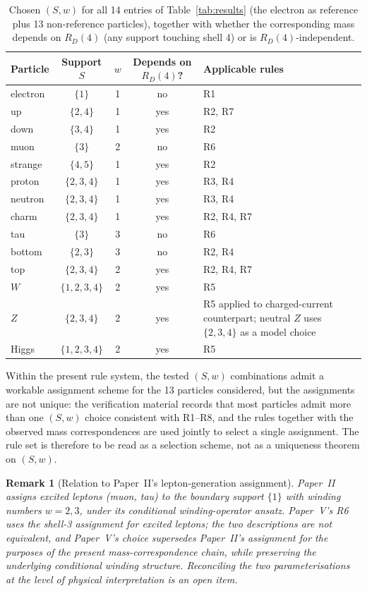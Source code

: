 \documentclass[12pt]{article}
\newtheorem{remark}[theorem]{Remark}
\begin{document}
\begin{table}[ht]
\centering
\caption{Chosen $(S, w)$ for all 14 entries of Table~\ref{tab:results} (the electron as reference plus 13 non-reference particles), together with whether the corresponding mass depends on $R_D(4)$ (any support touching shell 4) or is $R_D(4)$-independent.}
\label{tab:assignments}
\begin{tabular}{@{}lcccl@{}}
\toprule
Particle & Support $S$ & $w$ & Depends on $R_D(4)$? & Applicable rules \\
\midrule
electron & $\{1\}$          & 1 & no  & R1 \\
up       & $\{2, 4\}$       & 1 & yes & R2, R7 \\
down     & $\{3, 4\}$       & 1 & yes & R2 \\
muon     & $\{3\}$          & 2 & no  & R6 \\
strange  & $\{4, 5\}$       & 1 & yes & R2 \\
proton   & $\{2, 3, 4\}$    & 1 & yes & R3, R4 \\
neutron  & $\{2, 3, 4\}$    & 1 & yes & R3, R4 \\
charm    & $\{2, 3, 4\}$    & 1 & yes & R2, R4, R7 \\
tau      & $\{3\}$          & 3 & no  & R6 \\
bottom   & $\{2, 3\}$       & 3 & no  & R2, R4 \\
top      & $\{2, 3, 4\}$    & 2 & yes & R2, R4, R7 \\
$W$      & $\{1, 2, 3, 4\}$ & 2 & yes & R5 \\
$Z$      & $\{2, 3, 4\}$    & 2 & yes & R5 applied to charged-current counterpart; neutral $Z$ uses $\{2,3,4\}$ as a model choice \\
Higgs    & $\{1, 2, 3, 4\}$ & 2 & yes & R5 \\
\bottomrule
\end{tabular}
\end{table}

Within the present rule system, the tested $(S,w)$ combinations admit a workable assignment scheme for the 13 particles considered, but the assignments are not unique: the verification material records that most particles admit more than one $(S,w)$ choice consistent with R1--R8, and the rules together with the observed mass correspondences are used jointly to select a single assignment. The rule set is therefore to be read as a selection scheme, not as a uniqueness theorem on $(S,w)$.

\begin{remark}[Relation to Paper~II's lepton-generation assignment]
Paper~II~\citep{SmartII} assigns excited leptons (muon, tau) to the boundary support $\{1\}$ with winding numbers $w = 2, 3$, under its conditional winding-operator ansatz. Paper~V's R6 uses the shell-3 assignment for excited leptons; the two descriptions are not equivalent, and Paper~V's choice supersedes Paper~II's assignment for the purposes of the present mass-correspondence chain, while preserving the underlying conditional winding structure. Reconciling the two parameterisations at the level of physical interpretation is an open item.
\end{remark}
\end{document}
